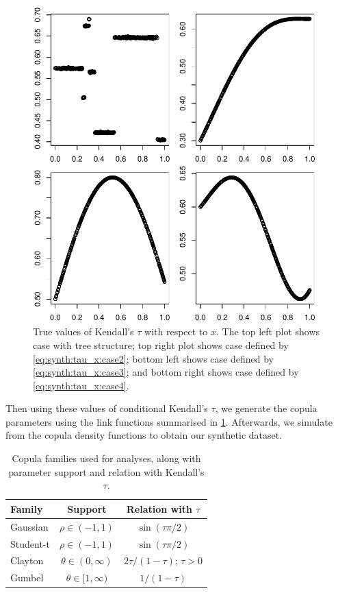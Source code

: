 \documentclass{amsart}
\begin{document}
\begin{figure}
    \centering
    \includegraphics[width=0.95\linewidth]{true_tau.pdf}
    \caption{True values of Kendall's $\tau$ with respect to $x$. The top left plot shows case with tree structure; top right plot shows case defined by \cref{eq:synth:tau_x:case2}; bottom left shows case defined by \cref{eq:synth:tau_x:case3}; and bottom right shows case defined by \cref{eq:synth:tau_x:case4}.}
    \label{fig:true:tau}
\end{figure}

Then using these values of conditional Kendall's $\tau$, we generate the copula parameters using the link functions summarised in \cref{tab:cop:link}. Afterwards, we simulate from the copula density functions to obtain our synthetic dataset.

\begin{table}
    \centering
    \begin{tabular}{l|c|c}
    \toprule
        Family & Support & Relation with $\tau$ \\
         \midrule
        Gaussian & $\rho \in (-1,1)$ & $\sin(\tau\pi/2)$ \\
        Student-t & $\rho \in (-1,1)$ & $\sin(\tau\pi/2)$ \\
        Clayton & $\theta \in (0,\infty)$ & $2\tau/(1-\tau)$; $\tau>0$ \\
        Gumbel & $\theta\in [1,\infty)$ & $1/(1-\tau)$ \\
        \bottomrule
    \end{tabular}
    \caption{Copula families used for analyses, along with parameter support and relation with Kendall's $\tau$.}
    \label{tab:cop:link}
\end{table}
\end{document}
